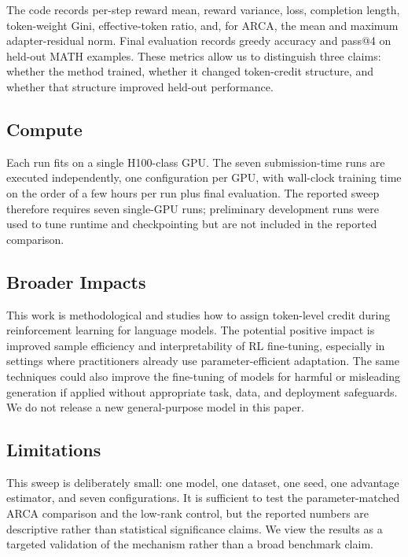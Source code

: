 The code records per-step reward mean, reward variance, loss, completion
length, token-weight Gini, effective-token ratio, and, for ARCA, the mean
and maximum adapter-residual norm. Final evaluation records greedy accuracy
and pass@4 on held-out MATH examples. These metrics allow us to distinguish
three claims: whether the method trained, whether it changed token-credit
structure, and whether that structure improved held-out performance.

\subsection{Compute}

Each run fits on a single H100-class GPU. The seven submission-time runs are
executed independently, one configuration per GPU, with wall-clock training
time on the order of a few hours per run plus final evaluation. The reported
sweep therefore requires seven single-GPU runs; preliminary development runs
were used to tune runtime and checkpointing but are not included in the
reported comparison.

\subsection{Broader Impacts}

This work is methodological and studies how to assign token-level credit
during reinforcement learning for language models. The potential positive
impact is improved sample efficiency and interpretability of RL fine-tuning,
especially in settings where practitioners already use parameter-efficient
adaptation. The same techniques could also improve the fine-tuning of models
for harmful or misleading generation if applied without appropriate task,
data, and deployment safeguards. We do not release a new general-purpose
model in this paper.

\subsection{Limitations}

This sweep is deliberately small: one model, one dataset, one seed, one
advantage estimator, and seven configurations. It is sufficient to test the
parameter-matched ARCA comparison and the low-rank control, but the reported
numbers are descriptive rather than statistical significance claims. We view
the results as a targeted validation of the mechanism rather than a broad
benchmark claim.
